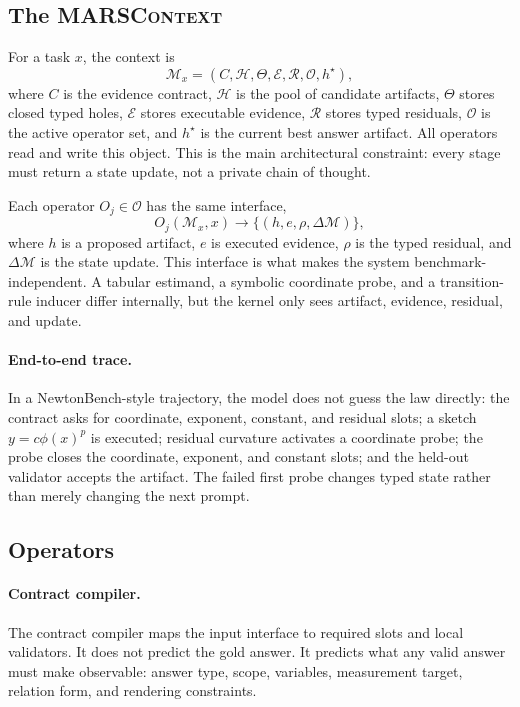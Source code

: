 \documentclass[letterpaper]{article}
\begin{document}
\subsection{The \textsc{MARSContext}}

For a task $x$, the context is
\begin{equation}
  \mathcal{M}_x=(C,\mathcal{H},\Theta,\mathcal{E},
  \mathcal{R},\mathcal{O},h^\star),
\end{equation}
where $C$ is the evidence contract, $\mathcal{H}$ is the pool of candidate
artifacts, $\Theta$ stores closed typed holes, $\mathcal{E}$ stores executable
evidence, $\mathcal{R}$ stores typed residuals, $\mathcal{O}$ is the active
operator set, and $h^\star$ is the current best answer artifact. All operators
read and write this object. This is the main architectural constraint: every
stage must return a state update, not a private chain of thought.

Each operator $O_j\in\mathcal{O}$ has the same interface,
\begin{equation}
  O_j(\mathcal{M}_x,x) \rightarrow
  \{(h,e,\rho,\Delta\mathcal{M})\},
\end{equation}
where $h$ is a proposed artifact, $e$ is executed evidence, $\rho$ is the typed
residual, and $\Delta\mathcal{M}$ is the state update. This interface is what
makes the system benchmark-independent. A tabular estimand, a symbolic
coordinate probe, and a transition-rule inducer differ internally, but the
kernel only sees artifact, evidence, residual, and update.

\paragraph{End-to-end trace.}
In a NewtonBench-style trajectory, the model does not guess the law directly:
the contract asks for coordinate, exponent, constant, and residual slots; a
sketch $y=c\phi(x)^p$ is executed; residual curvature activates a coordinate
probe; the probe closes the coordinate, exponent, and constant slots; and the
held-out validator accepts the artifact. The
failed first probe changes typed state rather than merely changing the next
prompt.

\subsection{Operators}

\paragraph{Contract compiler.}
The contract compiler maps the input interface to required slots and local
validators. It does not predict the gold answer. It predicts what any valid
answer must make observable: answer type, scope, variables, measurement target,
relation form, and rendering constraints.
\end{document}
